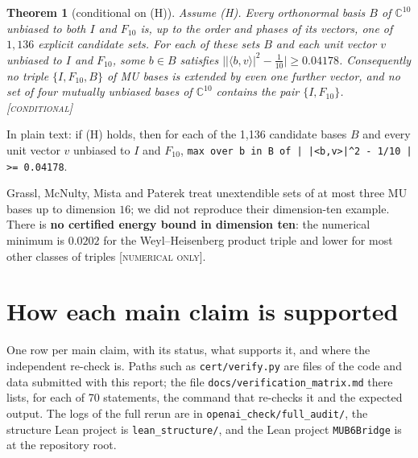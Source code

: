 \documentclass[11pt]{article}
\newcommand{\C}{\mathbb{C}}
\newcommand{\ip}[2]{\langle #1,#2\rangle}
\newcommand{\abs}[1]{\lvert #1\rvert}
\newcommand{\st}[1]{\textsc{[#1]}}
\newcommand{\stnum}{\st{numerical only}}
\newcommand{\stcond}{\st{conditional}}
\newtheorem{theorem}{Theorem}
\theoremstyle{definition}
\theoremstyle{remark}
\begin{document}
\begin{theorem}[conditional on (H)]\label{thm:ten}
Assume (H). Every orthonormal basis $B$ of $\C^{10}$ unbiased to both $I$ and $F_{10}$ is, up to the order and
phases of its vectors, one of $1{,}136$ explicit candidate sets. For each of these sets $B$ and each unit vector
$v$ unbiased to $I$ and $F_{10}$, some $b\in B$ satisfies $\bigl|\abs{\ip{b}{v}}^2-\tfrac1{10}\bigr|\ge0.04178$.
Consequently no triple $\{I,F_{10},B\}$ of MU bases is extended by even one further vector, and no set of four
mutually unbiased bases of $\C^{10}$ contains the pair $\{I,F_{10}\}$. \stcond
\end{theorem}

{\raggedright \noindent In plain text: if (H) holds, then for each of the 1,136 candidate bases $B$ and every unit vector $v$
unbiased to $I$ and $F_{10}$, \texttt{max over b in B of | |<b,v>|\textasciicircum2 -~1/10 | >= 0.04178}.\par}

\noindent Grassl, McNulty, Mista and Paterek \cite{GMMP17} treat unextendible sets of at most three MU bases up to
dimension $16$; we did not reproduce their dimension-ten example. There is \textbf{no certified energy bound in
dimension ten}: the numerical minimum is $0.0202$ for the Weyl--Heisenberg product triple and lower for most other classes of triples
\stnum.

\section{How each main claim is supported}\label{sec:support}

One row per main claim, with its status, what supports it, and where the independent re-check is. Paths such as \texttt{cert/verify.py} are files of the code and data submitted with this report; the file
\texttt{docs/verification\_matrix.md} there lists, for each of 70 statements, the command that re-checks it and
the expected output. The logs of the full rerun are in \texttt{openai\_check/full\_audit/}, the structure Lean project is \texttt{lean\_structure/}, and the Lean project \texttt{MUB6Bridge} is at the repository root.
\end{document}
